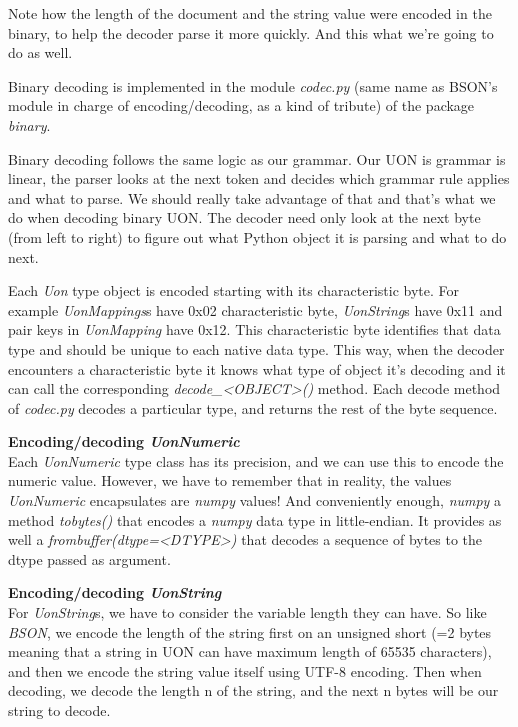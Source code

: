 \documentclass[12pt]{article}
\begin{document}
Note how the length of the document and the string value were encoded in the binary, to help the decoder parse it more quickly. And this what we're going to do as well.

Binary decoding is implemented in the module \emph{codec.py} (same name as BSON's module in charge of encoding/decoding, as a kind of tribute) of the package \emph{binary}. 

Binary decoding follows the same logic as our grammar. Our UON is grammar is linear, the parser looks at the next token and decides which grammar rule applies and what to parse. We should really take advantage of that and that's what we do when decoding binary UON. The decoder need only look at the next byte (from left to right) to figure out what Python object it is parsing and what to do next.

Each \emph{Uon} type object is encoded starting with its characteristic byte. For example \emph{UonMappings}s have 0x02 characteristic byte, \emph{UonString}s have 0x11 and pair keys in \emph{UonMapping} have 0x12. This characteristic byte identifies that data type and should be unique to each native data type. This way, when the decoder encounters a characteristic byte it knows what type of object it's decoding and it can call the corresponding \emph{decode\_<OBJECT>()} method. Each decode method of \emph{codec.py} decodes a particular type, and returns the rest of the byte sequence.

\textbf{Encoding/decoding \emph{UonNumeric}} \\
Each \emph{UonNumeric} type class has its precision, and we can use this to encode the numeric value. However, we have to remember that in reality, the values \emph{UonNumeric} encapsulates are \emph{numpy} values! And conveniently enough, \emph{numpy} a method \emph{tobytes()} that encodes a \emph{numpy} data type in little-endian. It provides as well a \emph{frombuffer(dtype=<DTYPE>)} that decodes a sequence of bytes to the dtype passed as argument. 

\textbf{Encoding/decoding \emph{UonString}} \\
For \emph{UonString}s, we have to consider the variable length they can have. So like \emph{BSON}, we encode the length of the string first on an unsigned short (=2 bytes meaning that a string in UON can have maximum length of 65535 characters), and then we encode the string value itself using UTF-8 encoding. Then when decoding, we decode the length n of the string, and the next n bytes will be our string to decode.
\end{document}
